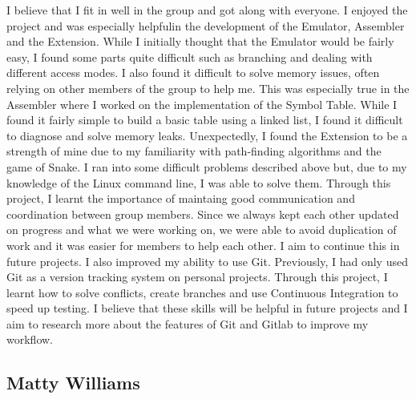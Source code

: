 \documentclass[11pt]{article}
\begin{document}
I believe that I fit in well in the group and got along with everyone. I enjoyed the project and was especially helpfulin the development of the Emulator, Assembler and the Extension. 
While I initially thought that the Emulator would be fairly easy, I found some parts quite difficult such as branching and dealing with different access modes. 
I also found it difficult to solve memory issues, often relying on other members of the group to help me. This was especially true in the Assembler where I worked on 
the implementation of the Symbol Table. While I found it fairly simple to build a basic table using a linked list, I found it difficult to diagnose and solve memory leaks. 
Unexpectedly, I found the Extension to be a strength of mine due to my familiarity with path-finding algorithms and the game of Snake. I ran into some difficult 
problems described above but, due to my knowledge of the Linux command line, I was able to solve them.
\newline
Through this project, I learnt the importance of maintaing good communication and coordination between group members. Since we always kept each other updated 
on progress and what we were working on, we were able to avoid duplication of work and it was easier for members to help each other. I aim to continue this in 
future projects. I also improved my ability to use Git. Previously, I had only used Git as a version tracking system on personal projects. Through this project, 
I learnt how to solve conflicts, create branches and use Continuous Integration to speed up testing. I believe that these skills will be helpful in future projects 
and I aim to research more about the features of Git and Gitlab to improve my workflow.

\subsection{Matty Williams}
\end{document}

